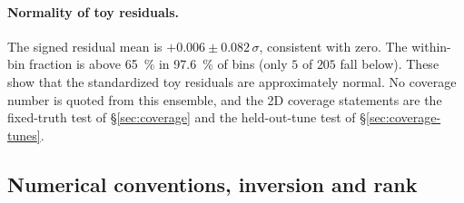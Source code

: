 \paragraph{Normality of toy residuals.} The signed residual mean is $+0.006 \pm 0.082\,\sigma$, consistent with zero. The within-bin fraction is above \SI{65}{\percent} in \SI{97.6}{\percent} of bins (only $5$ of $205$ fall below). These show that the standardized toy residuals are approximately normal. No coverage number is quoted from this ensemble, and the 2D coverage statements are the fixed-truth test of \S\ref{sec:coverage} and the held-out-tune test of \S\ref{sec:coverage-tunes}.

\subsection{Numerical conventions, inversion and rank}\label{recsec:methods-rank}


